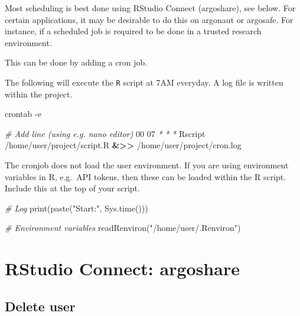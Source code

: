 \documentclass[
]{book}
\newenvironment{Shaded}{\begin{snugshade}}{\end{snugshade}}
\newcommand{\AttributeTok}[1]{\textcolor[rgb]{0.77,0.63,0.00}{#1}}
\newcommand{\CommentTok}[1]{\textcolor[rgb]{0.56,0.35,0.01}{\textit{#1}}}
\newcommand{\ExtensionTok}[1]{#1}
\newcommand{\FunctionTok}[1]{\textcolor[rgb]{0.00,0.00,0.00}{#1}}
\newcommand{\NormalTok}[1]{#1}
\newcommand{\OperatorTok}[1]{\textcolor[rgb]{0.81,0.36,0.00}{\textbf{#1}}}
\newcommand{\PreprocessorTok}[1]{\textcolor[rgb]{0.56,0.35,0.01}{\textit{#1}}}
\newcommand{\StringTok}[1]{\textcolor[rgb]{0.31,0.60,0.02}{#1}}
\begin{document}
Most scheduling is best done using RStudio Connect (argoshare), see below.
For certain applications, it may be desirable to do this on argonaut or argosafe.
For instance, if a scheduled job is required to be done in a trusted research environment.

This can be done by adding a cron job.

The following will execute the \texttt{R} script at 7AM everyday. A log file is written within the project.

\begin{Shaded}
\begin{Highlighting}[]
\ExtensionTok{crontab} \AttributeTok{{-}e}

\CommentTok{\# Add line (using e.g. nano editor)}
\ExtensionTok{00}\NormalTok{ 07 }\PreprocessorTok{*} \PreprocessorTok{*} \PreprocessorTok{*}\NormalTok{ Rscript /home/user/project/script.R }\OperatorTok{\&\textgreater{}\textgreater{}}\NormalTok{ /home/user/project/cron.log}
\end{Highlighting}
\end{Shaded}

The cronjob does not load the user environment.
If you are using environment variables in R, e.g.~API tokens, then these can be loaded within the R script.
Include this at the top of your script.

\begin{Shaded}
\begin{Highlighting}[]
\CommentTok{\# Log}
\FunctionTok{print}\NormalTok{(}\FunctionTok{paste}\NormalTok{(}\StringTok{"Start:"}\NormalTok{, }\FunctionTok{Sys.time}\NormalTok{()))}

\CommentTok{\# Environment variables}
\FunctionTok{readRenviron}\NormalTok{(}\StringTok{"/home/user/.Renviron"}\NormalTok{)}
\end{Highlighting}
\end{Shaded}

\hypertarget{rstudio-connect-argoshare}{%
\section{RStudio Connect: argoshare}\label{rstudio-connect-argoshare}}

\hypertarget{delete-user}{%
\subsection{Delete user}\label{delete-user}}
\end{document}
